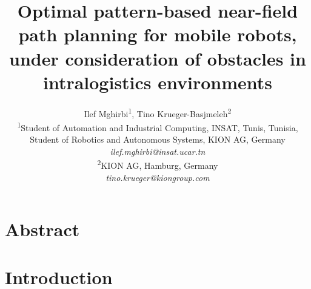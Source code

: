 \documentclass{amam}                %
\title{Optimal pattern-based near-field path planning for mobile robots, under consideration of obstacles in intralogistics environments}
\author{Ilef Mghirbi\textsuperscript{1}, Tino Krueger-Basjmeleh\textsuperscript{2}\\
\textsuperscript{1}Student of Automation and Industrial Computing, INSAT, Tunis, Tunisia, \\Student of Robotics and Autonomous Systems, KION AG, Germany\\
  {\it ilef.mghirbi@insat.ucar.tn} \\
\textsuperscript{2}KION AG, Hamburg, Germany\\
  {\it tino.krueger@kiongroup.com} \\
}
\begin{document}
\maketitle

\section*{Abstract}
\section{Introduction}
\end{document}
